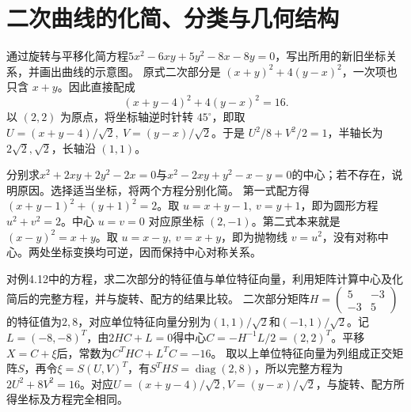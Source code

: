 \par\addvspace{12pt}

\section{二次曲线的化简、分类与几何结构}

通过旋转与平移化简方程\(5x^2-6xy+5y^2-8x-8y=0\)，写出所用的新旧坐标关系，并画出曲线的示意图。
\solutionanswer
原式二次部分是 \((x+y)^2+4(y-x)^2\)，一次项也只含 \(x+y\)。因此直接配成
\[
  (x+y-4)^2+4(y-x)^2=16 .
\]
以 \((2,2)\) 为原点，将坐标轴逆时针转 \(45^\circ\)，即取 \(U=(x+y-4)/\sqrt2,\ V=(y-x)/\sqrt2\)。于是 \(U^2/8+V^2/2=1\)，半轴长为 \(2\sqrt2,\sqrt2\)，长轴沿 \((1,1)\)。
\begin{center}
\end{center}


分别求\(x^2+2xy+2y^2-2x=0\)与\(x^2-2xy+y^2-x-y=0\)的中心；若不存在，说明原因。选择适当坐标，将两个方程分别化简。
\solutionanswer
第一式配方得 \((x+y-1)^2+(y+1)^2=2\)。取 \(u=x+y-1,\ v=y+1\)，即为圆形方程 \(u^2+v^2=2\)。中心 \(u=v=0\) 对应原坐标 \((2,-1)\)。第二式本来就是 \((x-y)^2=x+y\)。取 \(u=x-y,\ v=x+y\)，即为抛物线 \(v=u^2\)，没有对称中心。两处坐标变换均可逆，因而保持中心对称关系。


对例4.12中的方程，求二次部分的特征值与单位特征向量，利用矩阵计算中心及化简后的完整方程，并与旋转、配方的结果比较。
\solutionanswer
二次部分矩阵\(H=\left(\begin{smallmatrix}5&-3\\-3&5\end{smallmatrix}\right)\)的特征值为\(2,8\)，对应单位特征向量分别为\((1,1)/\sqrt2\)和\((-1,1)/\sqrt2\)。记\(L=(-8,-8)^T\)，由\(2HC+L=0\)得中心\(C=-H^{-1}L/2=(2,2)^T\)。平移\(X=C+\xi\)后，常数为\(C^THC+L^TC=-16\)。
取以上单位特征向量为列组成正交矩阵\(S\)，再令\(\xi=S(U,V)^T\)，有\(S^THS=\operatorname{diag}(2,8)\)，所以完整方程为\(2U^2+8V^2=16\)。对应\(U=(x+y-4)/\sqrt2,V=(y-x)/\sqrt2\)，与旋转、配方所得坐标及方程完全相同。


